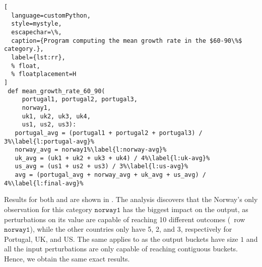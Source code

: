 \begin{lstlisting}[
  language=customPython,
  style=mystyle,
  escapechar=\%,
  caption={Program computing the mean growth rate in the $60-90\%$ category.},
  label={lst:rr},
  % float,
  % floatplacement=H
]
 def mean_growth_rate_60_90(
     portugal1, portugal2, portugal3,
     norway1,
     uk1, uk2, uk3, uk4,
     us1, us2, us3):
   portugal_avg = (portugal1 + portugal2 + portugal3) / 3%\label{l:portugal-avg}%
   norway_avg = norway1%\label{l:norway-avg}%
   uk_avg = (uk1 + uk2 + uk3 + uk4) / 4%\label{l:uk-avg}%
   us_avg = (us1 + us2 + us3) / 3%\label{l:us-avg}%
   avg = (portugal_avg + norway_avg + uk_avg + us_avg) / 4%\label{l:final-avg}%
\end{lstlisting}
%
%
\begin{margintable}
  \caption{Quantitative input usage for  from the Reinhart and Rogoff's article.}
  \centering
\end{margintable}
%
Results for both \abstractoutcomesname{} and \abstractrangename{} are shown in .
The analysis discovers that the Norway's only observation for this category $\texttt{norway1}$ has the biggest impact on the output, as perturbations on its value are capable of reaching 10 different outcomes (\cf~row $\texttt{norway1}$), while the other countries only have 5, 2, and 3, respectively for Portugal, UK, and US.
The same applies to \abstractrangename{} as the output buckets have size $1$ and all the input perturbations are only capable of reaching contiguous buckets. Hence, we obtain the same exact results.


